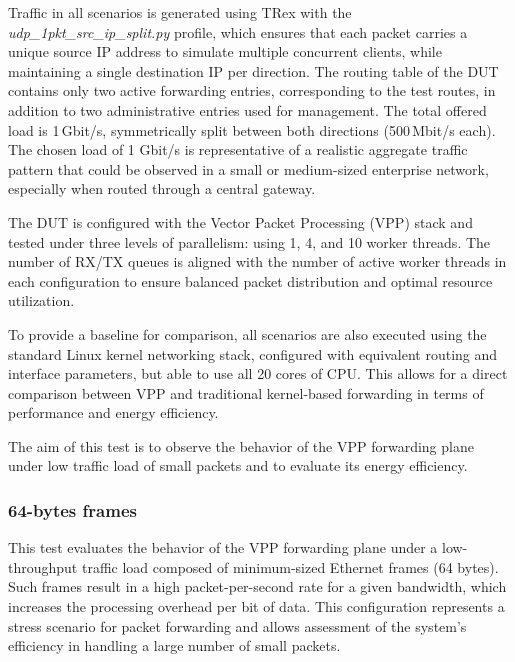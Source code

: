 Traffic in all scenarios is generated using TRex with the \textit{udp\_1pkt\_src\_ip\_split.py} profile, 
which ensures that each packet carries a unique source IP address to simulate multiple concurrent clients, while maintaining a single destination IP per direction. 
The routing table of the DUT contains only two active forwarding entries, corresponding to the test routes, in addition to two administrative entries used for management.
The total offered load is 1\,Gbit/s, symmetrically split between both directions (500\,Mbit/s each).
The chosen load of 1 Gbit/s is representative of a realistic aggregate traffic pattern that could be observed in a small or medium-sized enterprise network, especially when routed through a central gateway.

The DUT is configured with the Vector Packet Processing (VPP) stack and tested under three levels of parallelism: using 1, 4, and 10 worker threads. 
The number of RX/TX queues is aligned with the number of active worker threads in each configuration to ensure balanced packet distribution and optimal resource utilization.

To provide a baseline for comparison, all scenarios are also executed using the standard Linux kernel networking stack, 
configured with equivalent routing and interface parameters, but able to use all 20 cores of CPU. 
This allows for a direct comparison between VPP and traditional kernel-based forwarding in terms of performance and energy efficiency.

The aim of this test is to observe the behavior of the VPP forwarding plane under low traffic load of small packets and to evaluate its energy efficiency.

\subsubsection{64-bytes frames}
This test evaluates the behavior of the VPP forwarding plane under a low-throughput traffic load composed of minimum-sized Ethernet frames (64 bytes). 
Such frames result in a high packet-per-second rate for a given bandwidth, which increases the processing overhead per bit of data. 
This configuration represents a stress scenario for packet forwarding and allows assessment of the system’s efficiency in handling a large number of small packets.

